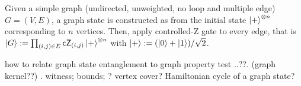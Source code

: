 \begin{definition}\label{def:graph_state}
	Given a simple graph (undirected, unweighted, no loop and multiple edge) $G=(V,E)$, a graph state is constructed as 
	from the initial state $\ket{+}^{\otimes n}$ corresponding to $n$ vertices.
	Then, apply controlled-Z gate to every edge, that is 
	$\ket{G}:=\prod_{(i,j)\in E}\textsf{cZ}_{(i,j)} \ket{+}^{\otimes n}$
	with $\ket{+}: = (\ket{0}+\ket{1})/\sqrt{2}$.
\end{definition}
\begin{question}
	how to relate graph state entanglement to graph property test
	..??. (graph kernel??)
	\cite{heinEntanglementGraphStates2006}.
	witness; bounds; ? vertex cover?
	Hamiltonian cycle of a graph state? 
\end{question} 

